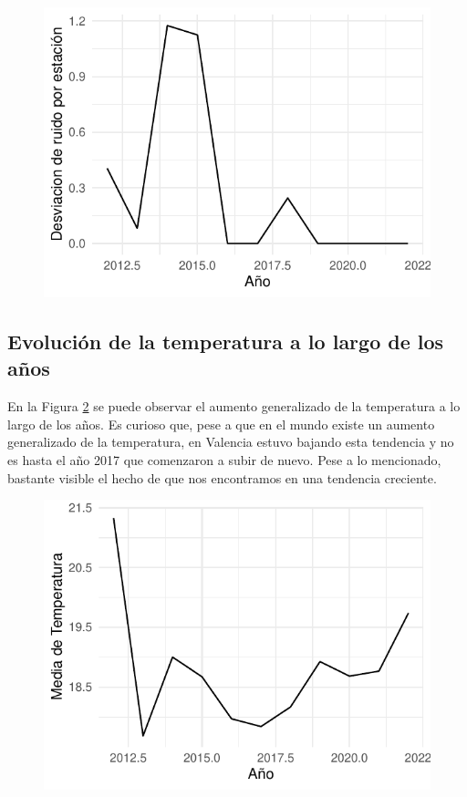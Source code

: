 \documentclass[notspecified,article,submit,moreauthors,pdftex]{Definitions/mdpi}
\begin{document}
\begin{figure}

\includegraphics[width=0.7\linewidth]{ProyectoAED2023_files/figure-latex/pregunta3_2-1} \hfill{}

\caption{\label{fig:pregunta3_2}}\label{fig:pregunta3_2}
\end{figure}

\hypertarget{evoluciuxf3n-de-la-temperatura-a-lo-largo-de-los-auxf1os}{%
\subsection{Evolución de la temperatura a lo largo de los
años}\label{evoluciuxf3n-de-la-temperatura-a-lo-largo-de-los-auxf1os}}

En la Figura \ref{fig:pregunta4} se puede observar el aumento
generalizado de la temperatura a lo largo de los años. Es curioso que,
pese a que en el mundo existe un aumento generalizado de la temperatura,
en Valencia estuvo bajando esta tendencia y no es hasta el año 2017 que
comenzaron a subir de nuevo. Pese a lo mencionado, bastante visible el
hecho de que nos encontramos en una tendencia creciente.

\begin{figure}

\includegraphics[width=0.7\linewidth]{ProyectoAED2023_files/figure-latex/pregunta4-1} \hfill{}

\caption{\label{fig:pregunta4}}\label{fig:pregunta4}
\end{figure}
\end{document}
